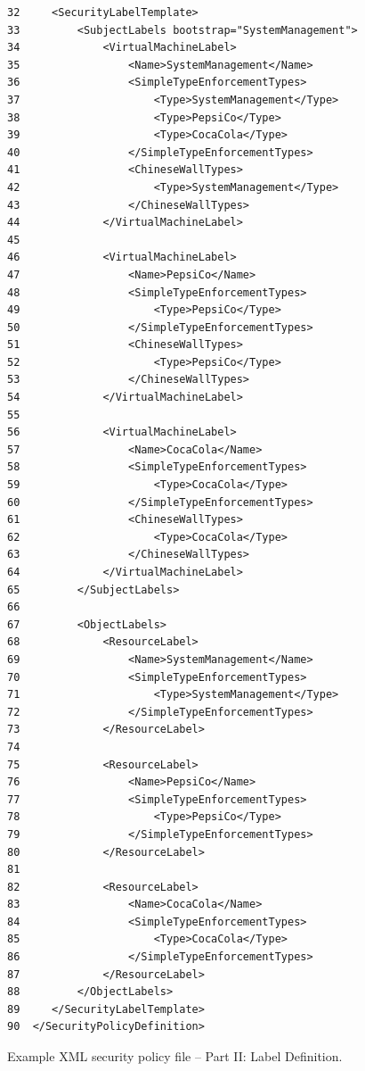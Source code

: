 \documentclass[11pt,twoside,final,openright]{report}
\begin{document}
\begin{figure}
\begin{scriptsize}
\begin{verbatim}
32     <SecurityLabelTemplate>
33         <SubjectLabels bootstrap="SystemManagement">
34             <VirtualMachineLabel>
35                 <Name>SystemManagement</Name>
36                 <SimpleTypeEnforcementTypes>
37                     <Type>SystemManagement</Type>
38                     <Type>PepsiCo</Type>
39                     <Type>CocaCola</Type>
40                 </SimpleTypeEnforcementTypes>
41                 <ChineseWallTypes>
42                     <Type>SystemManagement</Type>
43                 </ChineseWallTypes>
44             </VirtualMachineLabel>
45
46             <VirtualMachineLabel>
47                 <Name>PepsiCo</Name>
48                 <SimpleTypeEnforcementTypes>
49                     <Type>PepsiCo</Type>
50                 </SimpleTypeEnforcementTypes>
51                 <ChineseWallTypes>
52                     <Type>PepsiCo</Type>
53                 </ChineseWallTypes>
54             </VirtualMachineLabel>
55
56             <VirtualMachineLabel>
57                 <Name>CocaCola</Name>
58                 <SimpleTypeEnforcementTypes>
59                     <Type>CocaCola</Type>
60                 </SimpleTypeEnforcementTypes>
61                 <ChineseWallTypes>
62                     <Type>CocaCola</Type>
63                 </ChineseWallTypes>
64             </VirtualMachineLabel>
65         </SubjectLabels>
66
67         <ObjectLabels>
68             <ResourceLabel>
69                 <Name>SystemManagement</Name>
70                 <SimpleTypeEnforcementTypes>
71                     <Type>SystemManagement</Type>
72                 </SimpleTypeEnforcementTypes>
73             </ResourceLabel>
74
75             <ResourceLabel>
76                 <Name>PepsiCo</Name>
77                 <SimpleTypeEnforcementTypes>
78                     <Type>PepsiCo</Type>
79                 </SimpleTypeEnforcementTypes>
80             </ResourceLabel>
81
82             <ResourceLabel>
83                 <Name>CocaCola</Name>
84                 <SimpleTypeEnforcementTypes>
85                     <Type>CocaCola</Type>
86                 </SimpleTypeEnforcementTypes>
87             </ResourceLabel>
88         </ObjectLabels>
89     </SecurityLabelTemplate>
90  </SecurityPolicyDefinition>
\end{verbatim}
\end{scriptsize}
\caption{Example XML security policy file -- Part II: Label Definition.}
\label{fig:acmxmlfileb}
\end{figure}
\end{document}
